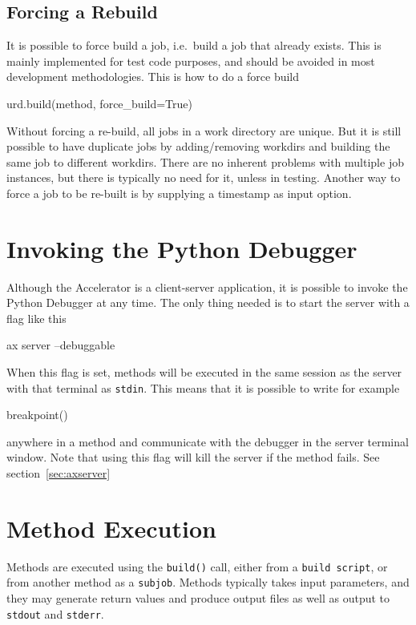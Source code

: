 \subsection{Forcing a Rebuild}
\label{sec:force_rebuild}
It is possible to force build a job, i.e.\ build a job that already
exists.  This is mainly implemented for test code purposes, and should
be avoided in most development methodologies.  This is how to do a
force build
\begin{python}
urd.build(method, force_build=True)
\end{python}
Without forcing a re-build, all jobs in a work directory are unique.
But it is still possible to have duplicate jobs by adding/removing
workdirs and building the same job to different workdirs.  There are
no inherent problems with multiple job instances, but there is
typically no need for it, unless in testing.  Another way to force a
job to be re-built is by supplying a timestamp as input option.




\section{Invoking the Python Debugger}
Although the Accelerator is a client-server application, it is
possible to invoke the Python Debugger at any time.  The only thing
needed is to start the server with a flag like this
\begin{shell}
ax server --debuggable
\end{shell}
When this flag is set, methods will be executed in the same session as
the server with that terminal as \texttt{stdin}.  This means that it
is possible to write for example
\begin{python}
breakpoint()
\end{python}
anywhere in a method and communicate with the debugger in the server
terminal window.  Note that using this flag will kill the server if
the method fails.  See section~\ref{sec:axserver}



\section{Method Execution}
Methods are executed using the \texttt{build()} call, either from a
\texttt{build script}, or from another method as a \texttt{subjob}.
Methods typically takes input parameters, and they may generate return
values and produce output files as well as output to \texttt{stdout}
and \texttt{stderr}.


